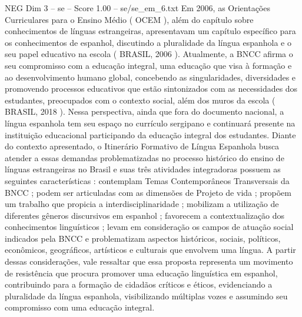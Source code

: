 \begin{textsample}{NEG Dim 3 – se – Score 1.00 – se/se\_em\_6.txt}
Em 2006, as Orientações Curriculares para o Ensino Médio ( OCEM ), além do capítulo sobre conhecimentos de línguas estrangeiras, apresentavam um capítulo específico para os conhecimentos de espanhol, discutindo a pluralidade da língua espanhola e o seu papel educativo na escola ( BRASIL, 2006 ).
Atualmente, a BNCC afirma o seu compromisso com a educação integral, uma educação que visa à formação e ao desenvolvimento humano global, concebendo as singularidades, diversidades e promovendo processos educativos que estão sintonizados com as necessidades dos estudantes, preocupados com o contexto social, além dos muros da escola ( BRASIL, 2018 ).
Nessa perspectiva, ainda que fora do documento nacional, a língua espanhola tem seu espaço no currículo sergipano e continuará presente na instituição educacional participando da educação integral dos estudantes.
Diante do contexto apresentado, o Itinerário Formativo de Língua Espanhola busca atender a essas demandas problematizadas no processo histórico do ensino de línguas estrangeiras no Brasil e suas três atividades integradoras possuem as seguintes características : contemplam Temas Contemporâneos Transversais da BNCC ; podem ser articuladas com as dimensões de Projeto de vida ; propõem um trabalho que propicia a interdisciplinaridade ; mobilizam a utilização de diferentes gêneros discursivos em espanhol ; favorecem a contextualização dos conhecimentos linguísticos ; levam em consideração os campos de atuação social indicados pela BNCC e problematizam aspectos históricos, sociais, políticos, econômicos, geográficos, artísticos e culturais que envolvem uma língua.
A partir dessas considerações, vale ressaltar que essa proposta representa um movimento de resistência que procura promover uma educação linguística em espanhol, contribuindo para a formação de cidadãos críticos e éticos, evidenciando a pluralidade da língua espanhola, visibilizando múltiplas vozes e assumindo seu compromisso com uma educação integral.

\end{textsample}
